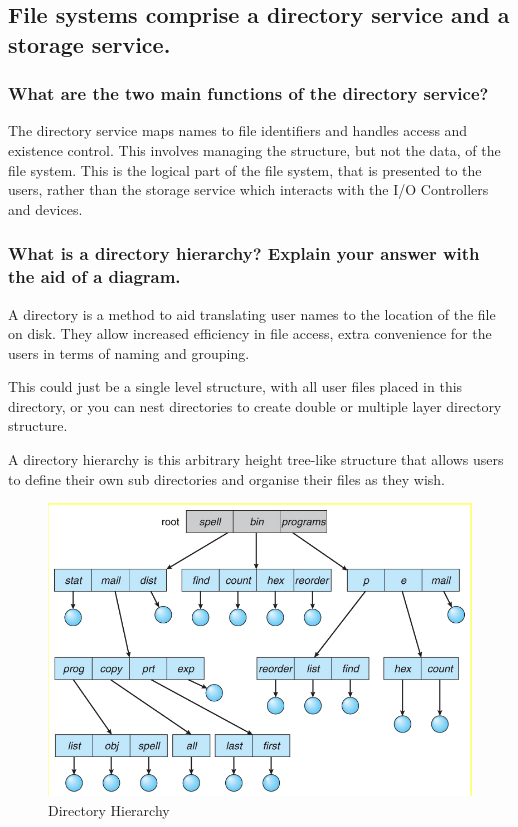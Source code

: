 \documentclass[]{article}
\begin{document}
    \subsection{File systems comprise a directory service and a storage service.}

        \subsubsection{What are the two main functions of the directory service?}

            The directory service maps names to file identifiers and handles access and existence control. This involves managing the structure, but not the data, of the file system. This is the logical part of the file system, that is presented to the users, rather than the storage service which interacts with the I/O Controllers and devices.

        \subsubsection{What is a directory hierarchy? Explain your answer with the aid of a diagram.}

            A directory is a method to aid translating user names to the location of the file on disk. They allow increased efficiency in file access, extra convenience for the users in terms of naming and grouping.

            This could just be a single level structure, with all user files placed in this directory, or you can nest directories to create double or multiple layer directory structure.

            A directory hierarchy is this arbitrary height tree-like structure that allows users to define their own sub directories and organise their files as they wish.

        \begin{figure}[ht]
            \centering
            \includegraphics[width=0.5\linewidth]{"media/tree-directory"}
            \caption{Directory Hierarchy}
        \end{figure}
\end{document}

